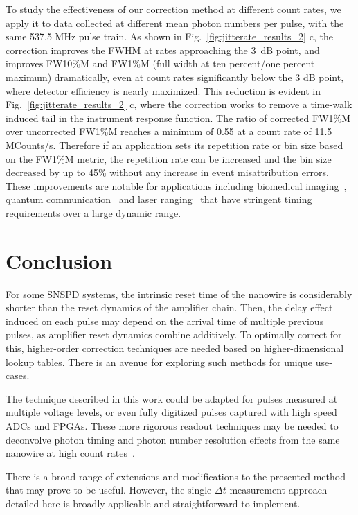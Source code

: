 \documentclass[11pt]{caltech_thesis} %
\begin{document}
To study the effectiveness of our correction method at different count
rates, we apply it to data collected at different mean photon numbers
per pulse, with the same 537.5 MHz pulse train. As shown in
Fig.~\ref{fig:jitterate_results_2} c, the correction improves the FWHM
at rates approaching the 3~dB point, and improves FW10\%M
and FW1\%M (full width at ten percent/one percent maximum) dramatically,
even at count rates significantly below the 3 dB point, where detector
efficiency is nearly maximized. This reduction is evident in
Fig.~\ref{fig:jitterate_results_2} c, where the correction works to
remove a time-walk induced tail in the instrument response function. The
ratio of corrected FW1\%M over uncorrected FW1\%M reaches a minimum of
0.55 at a count rate of 11.5 MCounts/s. Therefore if an application sets
its repetition rate or bin size based on the FW1\%M metric, the
repetition rate can be increased and the bin size decreased by up to
45\% without any increase in event misattribution errors. These
improvements are notable for applications including biomedical
imaging~\autocite{Sutin16,Bruschini2019}, quantum
communication~\autocite{Hadfield2009} and laser
ranging~\autocite{McCarthy13} that have stringent timing
requirements over a large dynamic range.

\hypertarget{conclusion}{%
\section{Conclusion}\label{conclusion}}

For some SNSPD systems, the intrinsic reset time of the nanowire is
considerably shorter than the reset dynamics of the amplifier chain.
Then, the delay effect induced on each pulse may depend on the arrival
time of multiple previous pulses, as amplifier reset dynamics combine
additively. To optimally correct for this, higher-order correction
techniques are needed based on higher-dimensional lookup tables. There
is an avenue for exploring such methods for unique use-cases.

The technique described in this work could be adapted for pulses
measured at multiple voltage levels, or even fully digitized pulses
captured with high speed ADCs and FPGAs. These more rigorous readout
techniques may be needed to deconvolve photon timing and photon number
resolution effects from the same nanowire at high count
rates~\autocite{Hao2021}.

There is a broad range of extensions and modifications to the presented
method that may prove to be useful. However, the single-$\Delta t$
measurement approach detailed here is broadly applicable and
straightforward to implement.
\end{document}
